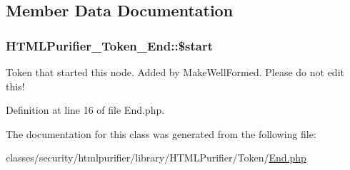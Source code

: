 \subsection{Member Data Documentation}
\hypertarget{classHTMLPurifier__Token__End_a07ce05890f8dd957bb9bc6822cb540ba}{
\subsubsection[{\$start}]{\setlength{\rightskip}{0pt plus 5cm}H\+T\+M\+L\+Purifier\+\_\+\+Token\+\_\+\+End\+::\$start}}\label{classHTMLPurifier__Token__End_a07ce05890f8dd957bb9bc6822cb540ba}
Token that started this node. Added by Make\+Well\+Formed. Please do not edit this! 

Definition at line 16 of file End.\+php.



The documentation for this class was generated from the following file\+:\begin{DoxyCompactItemize}
\item 
classes/security/htmlpurifier/library/\+H\+T\+M\+L\+Purifier/\+Token/\hyperlink{End_8php}{End.\+php}\end{DoxyCompactItemize}
